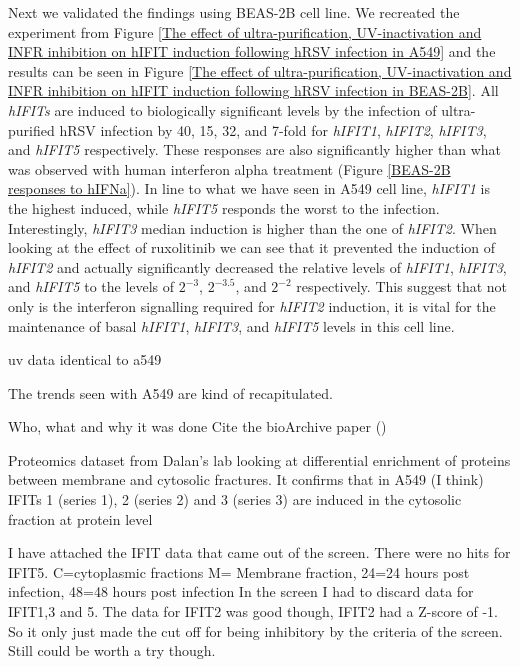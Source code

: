 Next we validated the findings using BEAS-2B cell line. We recreated the experiment from Figure \ref{The effect of ultra-purification, UV-inactivation and INFR inhibition on hIFIT induction following hRSV infection in A549} and the results can be seen in Figure \ref{The effect of ultra-purification, UV-inactivation and INFR inhibition on hIFIT induction following hRSV infection in BEAS-2B}. All \textit{hIFITs} are induced to biologically significant levels by the infection of ultra-purified hRSV infection by 40, 15, 32, and 7-fold for \textit{hIFIT1}, \textit{hIFIT2}, \textit{hIFIT3}, and \textit{hIFIT5} respectively. These responses are also significantly higher than what was observed with human interferon alpha treatment (Figure \ref{BEAS-2B responses to hIFNa}). In line to what we have seen in A549 cell line, \textit{hIFIT1} is the highest induced, while \textit{hIFIT5} responds the worst to the infection. Interestingly, \textit{hIFIT3} median induction is higher than the one of \textit{hIFIT2}. When looking at the effect of ruxolitinib we can see that it prevented the induction of \textit{hIFIT2} and actually significantly decreased the relative levels of \textit{hIFIT1}, \textit{hIFIT3}, and \textit{hIFIT5} to the levels of \(2^{-3}\), \(2^{-3.5}\), and \(2^{-2}\) respectively. This suggest that not only is the interferon signalling required for \textit{hIFIT2} induction, it is vital for the maintenance  of basal \textit{hIFIT1}, \textit{hIFIT3}, and \textit{hIFIT5} levels in this cell line. 

uv data identical to a549

The trends seen with A549 are kind of recapitulated.




 \label{Validation by Comparing to the Proteomic Dataset}
Who, what and why it was done
Cite the bioArchive paper (\cite{Jobe2023ViralCondensates})

Proteomics dataset from Dalan’s lab looking at differential enrichment of proteins between membrane and cytosolic fractures. It confirms that in A549 (I think) IFITs 1 (series 1), 2 (series 2) and 3 (series 3) are induced in the cytosolic fraction at protein level 



I have attached the IFIT data that came out of the screen. There were no hits for IFIT5. C=cytoplasmic fractions M= Membrane fraction, 24=24 hours post infection, 48=48 hours post infection
In the screen I had to discard data for IFIT1,3 and 5. The data for IFIT2 was good though, IFIT2 had a Z-score of -1. So it only just made the cut off for being inhibitory by the criteria of the screen. Still could be worth a try though.



